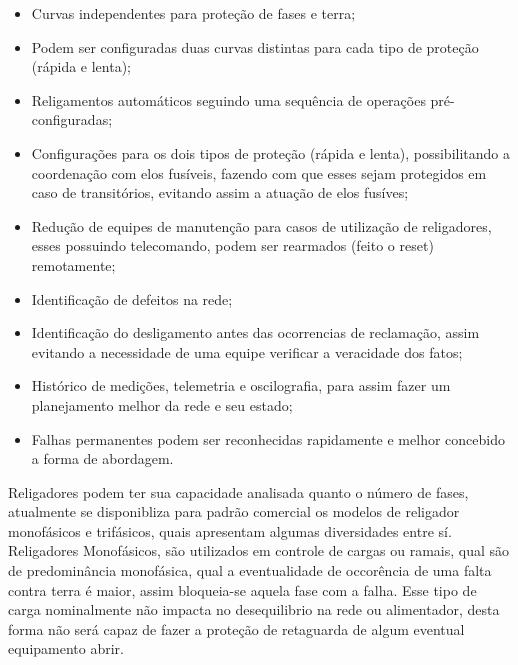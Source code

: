 \documentclass[oneside,openright,12pt]{ufsm_2021} %
\begin{document}
\begin{itemize}
	\item Curvas independentes para proteção de fases e terra;
	\item Podem ser configuradas duas curvas distintas para cada tipo de proteção (rápida e lenta);
	\item Religamentos automáticos seguindo uma sequência de operações pré-configuradas;
	\item Configurações para os dois tipos de proteção (rápida e lenta), possibilitando a coordenação com elos fusíveis, fazendo com que esses sejam protegidos em caso de transitórios, evitando assim a atuação de elos fusíves;
	\item Redução de equipes de manutenção para casos de utilização de religadores, esses possuindo telecomando, podem ser rearmados (feito o reset) remotamente;
	\item Identificação de defeitos na rede;
	\item Identificação do desligamento antes das ocorrencias de reclamação, assim evitando a necessidade de uma equipe verificar a veracidade dos fatos;
	\item Histórico de medições, telemetria e oscilografia, para assim fazer um planejamento melhor da rede e seu estado;
	\item Falhas permanentes podem ser reconhecidas rapidamente e melhor concebido a forma de abordagem.
\end{itemize}

\par Religadores podem ter sua capacidade analisada quanto o número de fases, atualmente se disponibliza para padrão comercial os modelos de religador monofásicos e trifásicos, quais apresentam algumas diversidades entre sí.
Religadores Monofásicos, são utilizados em controle de cargas ou ramais, qual são de predominância monofásica, qual a eventualidade de occorência de uma falta contra terra é maior, assim bloqueia-se aquela fase com a falha. Esse tipo de carga nominalmente não impacta no desequilibrio na rede ou alimentador, desta forma não será capaz de fazer a proteção de retaguarda de algum eventual equipamento abrir.
\end{document}
